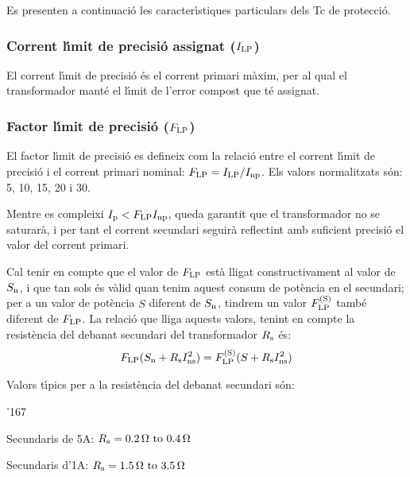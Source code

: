 Es presenten a continuaci\'{o} les caracter\'{\i}stiques particulars dels Tc
de protecci\'{o}.

\subsubsection{Corrent l\'{\i}mit de precisi\'{o} assignat ($I_\mathrm{LP}$)}

El corrent
l\'{\i}mit de precisi\'{o} \'{e}s el corrent primari m\`{a}xim, per al qual el transformador mant\'{e} el l\'{\i}mit
de l'error compost que t\'{e} assignat.

\subsubsection{Factor l\'{\i}mit de precisi\'{o} ($F_\mathrm{LP}$) }

 El factor l\'{\i}mit de precisi\'{o}
es defineix com la relaci\'{o} entre el corrent l\'{\i}mit de precisi\'{o}
i el corrent primari nominal: $F_\mathrm{LP} = I_\mathrm{LP} /I_\mathrm{np}$.
Els valors normalitzats s\'{o}n: 5, 10, 15, 20 i 30.

Mentre es compleixi  $I_\mathrm{p}<F_\mathrm{LP} I_\mathrm{np}$, queda garantit
que el transformador no se saturar\`{a}, i per tant el corrent
secundari seguir\`{a} reflectint amb suficient precisi\'{o} el valor del
corrent primari.

Cal tenir en compte que el valor de $F_\mathrm{LP}$ est\`{a} lligat
constructivament al valor de $S_\mathrm{n}$, i que tan sols \'{e}s v\`{a}lid
quan tenim aquest consum de  pot\`{e}ncia en el secundari; per a un
valor de pot\`{e}ncia $S$ diferent de $S_\mathrm{n}$, tindrem un valor
$F_\mathrm{LP}^\mathrm{(S)}$ tamb\'{e} diferent de  $F_\mathrm{LP}$. La relaci\'{o} que
lliga aquests valors, tenint en compte la resist\`{e}ncia del debanat
secundari del transformador  $R_\mathrm{s}$ \'{e}s:
\begin{equation}\label{eq:flp}
    F_\mathrm{LP} (S_\mathrm{n}+R_\mathrm{s}I_\mathrm{ns}^2) =
    F_\mathrm{LP}^\mathrm{(S)} (S+R_\mathrm{s}I_\mathrm{ns}^2)
\end{equation}

Valors t\'{\i}pics per a la resist\`{e}ncia del debanat secundari s\'{o}n:
\begin{dinglist}{'167}
    \item Secundaris de 5\unit{A}: $R\ped{s} = \SIrange{0,2}{0,4}{\ohm}$
    \item Secundaris d'1\unit{A}:  $R\ped{s} = \SIrange{1,5}{3,5}{\ohm}$
\end{dinglist}

